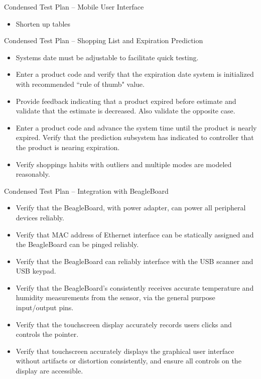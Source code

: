\documentclass[t]{beamer}
\begin{document}
\begin{frame}{Condensed Test Plan -- Mobile User Interface}
\begin{itemize}
\item Shorten up tables
\end{itemize}
\end{frame}

\begin{frame}{Condensed Test Plan -- Shopping List and Expiration Prediction}
\begin{itemize}
\item Systems date must be adjustable to facilitate quick testing.
\item Enter a product code and verify that the expiration date system is initialized with recommended ``rule of thumb" value.
\item Provide feedback indicating that a product expired before estimate and validate that the estimate is decreased. Also validate the opposite case.
\item Enter a product code and advance the system time until the product is nearly expired. Verify that the prediction subsystem has indicated to controller that the product is nearing expiration.
\item Verify shoppings habits with outliers and multiple modes are modeled reasonably.
\end{itemize}
\end{frame}

\begin{frame}{Condensed Test Plan -- Integration with BeagleBoard}
\begin{itemize}
\item Verify that the BeagleBoard, with power adapter, can power all peripheral devices reliably.
\item Verify that MAC address of Ethernet interface can be statically assigned and the BeagleBoard can be pinged reliably.
\item Verify that the BeagleBoard can reliably interface with the USB scanner and USB keypad.
\item Verify that the BeagleBoard's consistently receives accurate temperature and humidity measurements from the sensor, via the general purpose input/output pins.
\item Verify that the touchscreen display accurately records users clicks and controls the pointer.
\item Verify that touchscreen accurately displays the graphical user interface without artifacts or distortion consistently, and ensure all controls on the display are accessible.
\end{itemize}
\end{frame}
\end{document}
